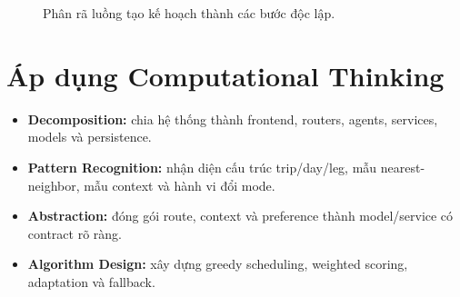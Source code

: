 \begin{figure}[H]
\centering
{}
\caption{Phân rã luồng tạo kế hoạch thành các bước độc lập.}
\label{fig:decomposition}
\end{figure}

\section{Áp dụng Computational Thinking}

\begin{itemize}
  \item \textbf{Decomposition:} chia hệ thống thành frontend, routers, agents, services, models và persistence.
  \item \textbf{Pattern Recognition:} nhận diện cấu trúc trip/day/leg, mẫu nearest-neighbor, mẫu context và hành vi đổi mode.
  \item \textbf{Abstraction:} đóng gói route, context và preference thành model/service có contract rõ ràng.
  \item \textbf{Algorithm Design:} xây dựng greedy scheduling, weighted scoring, adaptation và fallback.
\end{itemize}
